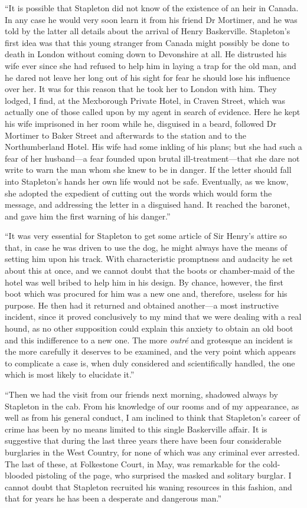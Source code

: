 \documentclass[paper=5.5in:8.5in,BCOR=7mm,twoside,DIV=calc,12pt,usegeometry,openany,chapterprefix,endperiod,headings=big]{scrbook} %
\begin{document}
\enquote{It is possible that Stapleton did not know of the existence of an heir in Canada. In any case he would very soon learn it from his friend Dr Mortimer, and he was told by the latter all details about the arrival of Henry Baskerville. Stapleton's first idea was that this young stranger from Canada might possibly be done to death in London without coming down to Devonshire at all. He distrusted his wife ever since she had refused to help him in laying a trap for the old man, and he dared not leave her long out of his sight for fear he should lose his influence over her. It was for this reason that he took her to London with him. They lodged, I find, at the Mexborough Private Hotel, in Craven Street, which was actually one of those called upon by my agent in search of evidence. Here he kept his wife imprisoned in her room while he, disguised in a beard, followed Dr Mortimer to Baker Street and afterwards to the station and to the Northumberland Hotel. His wife had some inkling of his plans; but she had such a fear of her husband---a fear founded upon brutal ill-treatment---that she dare not write to warn the man whom she knew to be in danger. If the letter should fall into Stapleton's hands her own life would not be safe. Eventually, as we know, she adopted the expedient of cutting out the words which would form the message, and addressing the letter in a disguised hand. It reached the baronet, and gave him the first warning of his danger.}

\enquote{It was very essential for Stapleton to get some article of Sir Henry's attire so that, in case he was driven to use the dog, he might always have the means of setting him upon his track. With characteristic promptness and audacity he set about this at once, and we cannot doubt that the boots or chamber-maid of the hotel was well bribed to help him in his design. By chance, however, the first boot which was procured for him was a new one and, therefore, useless for his purpose. He then had it returned and obtained another---a most instructive incident, since it proved conclusively to my mind that we were dealing with a real hound, as no other supposition could explain this anxiety to obtain an old boot and this indifference to a new one. The more \textit{outré} and grotesque an incident is the more carefully it deserves to be examined, and the very point which appears to complicate a case is, when duly considered and scientifically handled, the one which is most likely to elucidate it.}

\enquote{Then we had the visit from our friends next morning, shadowed always by Stapleton in the cab. From his knowledge of our rooms and of my appearance, as well as from his general conduct, I am inclined to think that Stapleton's career of crime has been by no means limited to this single Baskerville affair. It is suggestive that during the last three years there have been four considerable burglaries in the West Country, for none of which was any criminal ever arrested. The last of these, at Folkestone Court, in May, was remarkable for the cold-blooded pistoling of the page, who surprised the masked and solitary burglar. I cannot doubt that Stapleton recruited his waning resources in this fashion, and that for years he has been a desperate and dangerous man.}
\end{document}
